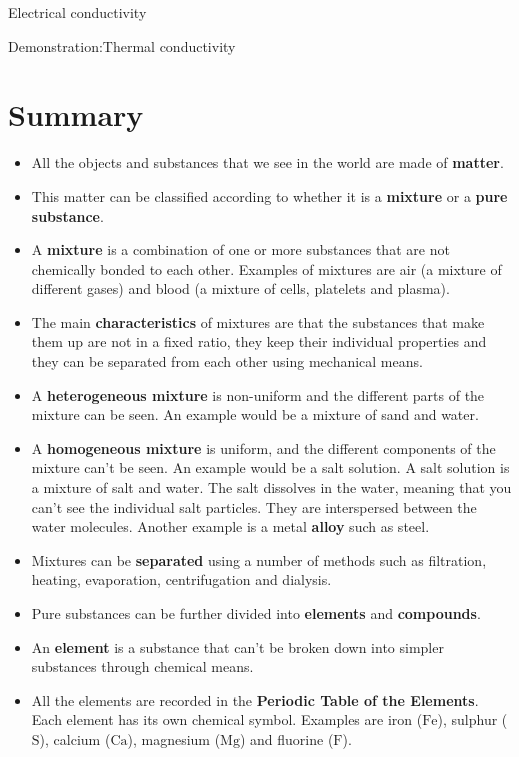 \begin{iexperiment}{Electrical conductivity}
\begin{gexperiment}{Demonstration:Thermal conductivity}
            \section{Summary}
            \nopagebreak
      \label{m38706*id67458}\begin{itemize}[noitemsep]
            \label{m38706*uid114}\item All the objects and substances that we see in the world are made of \textbf{matter}.
\label{m38706*uid115}\item This matter can be classified according to whether it is a \textbf{mixture} or a \textbf{pure substance}.
\label{m38706*uid116}\item A \textbf{mixture} is a combination of one or more substances that are not chemically bonded to each other. Examples of mixtures are air (a mixture of different gases) and blood (a mixture of cells, platelets and plasma).
\label{m38706*uid117}\item The main \textbf{characteristics} of mixtures are that the substances that make them up are not in a fixed ratio, they keep their individual properties and they can be separated from each other using mechanical means.
\label{m38706*uid118}\item A \textbf{heterogeneous mixture} is non-uniform and the different parts of the mixture can be seen. An example would be a mixture of sand and water.
\label{m38706*uid119}\item A \textbf{homogeneous mixture} is uniform, and the different components of the mixture can't be seen. An example would be a salt solution. A salt solution is a mixture of salt and water. The salt dissolves in the water, meaning that you can't see the individual salt particles. They are interspersed between the water molecules. Another example is a metal \textbf{alloy} such as steel.
\label{m38706*uid120}\item Mixtures can be \textbf{separated} using a number of methods such as filtration, heating, evaporation, centrifugation and dialysis.
\label{m38706*uid121}\item Pure substances can be further divided into \textbf{elements} and \textbf{compounds}.
\label{m38706*uid122}\item An \textbf{element} is a substance that can't be broken down into simpler substances through chemical means.
\label{m38706*uid123}\item All the elements are recorded in the \textbf{Periodic Table of the Elements}. Each element has its own chemical symbol. Examples are iron ($\mathrm{Fe}$), sulphur ($\mathrm{S}$), calcium ($\mathrm{Ca}$), magnesium ($\mathrm{Mg}$) and fluorine ($\mathrm{F}$).

\end{itemize}
\end{gexperiment}
\end{iexperiment}
